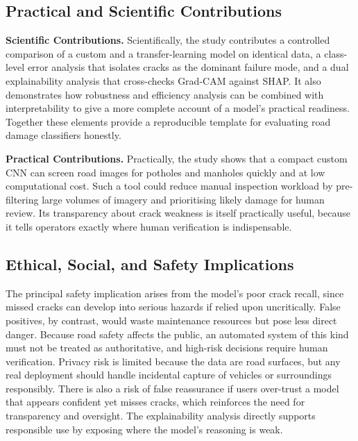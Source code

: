 \documentclass[preprint,12pt]{elsarticle}
\begin{document}
\subsection{Practical and Scientific Contributions}

\textbf{Scientific Contributions.}
Scientifically, the study contributes a controlled comparison of a custom and a transfer-learning model on identical data, a class-level error analysis that isolates cracks as the dominant failure mode, and a dual explainability analysis that cross-checks Grad-CAM against SHAP.
It also demonstrates how robustness and efficiency analysis can be combined with interpretability to give a more complete account of a model's practical readiness.
Together these elements provide a reproducible template for evaluating road damage classifiers honestly.

\textbf{Practical Contributions.}
Practically, the study shows that a compact custom CNN can screen road images for potholes and manholes quickly and at low computational cost.
Such a tool could reduce manual inspection workload by pre-filtering large volumes of imagery and prioritising likely damage for human review.
Its transparency about crack weakness is itself practically useful, because it tells operators exactly where human verification is indispensable.

\subsection{Ethical, Social, and Safety Implications}

The principal safety implication arises from the model's poor crack recall, since missed cracks can develop into serious hazards if relied upon uncritically.
False positives, by contrast, would waste maintenance resources but pose less direct danger.
Because road safety affects the public, an automated system of this kind must not be treated as authoritative, and high-risk decisions require human verification.
Privacy risk is limited because the data are road surfaces, but any real deployment should handle incidental capture of vehicles or surroundings responsibly.
There is also a risk of false reassurance if users over-trust a model that appears confident yet misses cracks, which reinforces the need for transparency and oversight.
The explainability analysis directly supports responsible use by exposing where the model's reasoning is weak.
\end{document}

